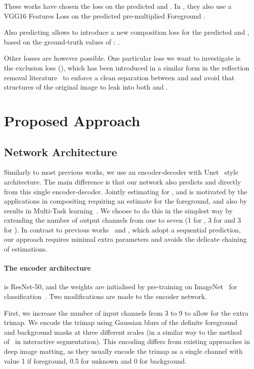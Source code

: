 \documentclass[runningheads]{llncs}
\begin{document}
These works have chosen the  loss on the predicted  and .  In
\cite{ContextMatting}, they also use a VGG16 Features Loss on the predicted
pre-multiplied Foreground .

Also predicting  allows \cite{LearningBasedSamplingMatting} to introduce a new composition loss for the predicted  and , based on the
ground-truth values of : .


Other losses are however possible. One particular loss we want to investigate is
the exclusion loss (), which has been introduced in a similar form in the reflection removal literature~\cite{perceptualReflectionRemoval}
to enforce a clean separation between  and  and avoid that structures of
the original image to leak into both  and .



\section{Proposed Approach}\label{sec:method}




\subsection{Network Architecture}

Similarly to most previous works, we use an encoder-decoder with
Unet~\cite{unet} style architecture. The main difference is that our network
also predicts  and  directly from this single encoder-decoder. Jointly
estimating for ,  and  is motivated by the applications in
compositing requiring an estimate for the foreground, and also by results in
Multi-Task learning~\cite{ruder2017overview}. We choose to do this in the simplest way by
extending the number of output channels from one to seven (1 for , 3 for
 and 3 for ). In contrast to previous works~\cite{ContextMatting} and
\cite{LearningBasedSamplingMatting}, which adopt a sequential prediction, our
approach requires minimal extra parameters and avoids the delicate chaining of
estimations.


\paragraph{The encoder architecture} is ResNet-50, and the weights are
initialised by pre-training on ImageNet~\cite{imagenet} for
classification~\cite{weightstandardization}. Two modifications are made to the
encoder network.

First, we increase the number of input channels from 3 to 9 to allow for the
extra trimap.  We encode the trimap using Gaussian blurs of the definite
foreground and background masks at three different scales (in a similar way to
the method of~\cite{LeInteractiveSelection} in interactive segmentation). This
encoding differs from existing approaches in deep image matting, as they usually
encode the trimap as a single channel with value 1 if foreground, 0.5 for
unknown and 0 for background.
\end{document}
